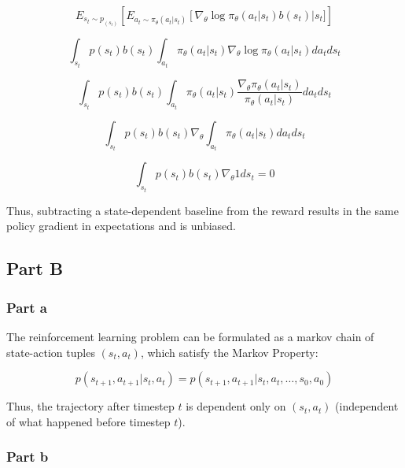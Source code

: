 \documentclass{article}
\begin{document}
    \begin{equation*}
        E_{s_t\sim p_(s_t)} \left[ E_{a_t\sim \pi_\theta(a_t|s_t)}\left[\nabla_\theta \log \pi_\theta(a_t|s_t) b(s_t)\right | s_t]\right]
    \end{equation*}

    \begin{equation*}
        \int_{s_t} p(s_t) b(s_t) \int_{a_t} \pi_\theta (a_t|s_t)\nabla_\theta \log \pi_\theta(a_t|s_t)da_t ds_t
    \end{equation*}

    \begin{equation*}
        \int_{s_t} p(s_t) b(s_t) \int_{a_t} \pi_\theta (a_t|s_t) \frac{\nabla_\theta \pi_\theta(a_t|s_t)}{\pi_\theta(a_t|s_t)} da_t ds_t
    \end{equation*}

    \begin{equation*}
        \int_{s_t} p(s_t) b(s_t) \nabla_\theta \int_{a_t} \pi_\theta (a_t|s_t) da_t ds_t
    \end{equation*}

    \begin{equation*}
        \int_{s_t} p(s_t) b(s_t) \nabla_\theta 1 ds_t = 0
    \end{equation*}

    Thus, subtracting a state-dependent baseline from the reward results in the same policy gradient
    in expectations and is unbiased.

    \subsection{Part B}

    \subsubsection{Part a}
    The reinforcement learning problem can be formulated as a markov chain 
    of state-action tuples $(s_t,a_t)$, which satisfy the Markov Property:

    \begin{equation*}
        p(s_{t+1}, a_{t+1}| s_{t}, a_{t}) = p(s_{t+1}, a_{t+1} | s_{t}, a_{t}, \ldots , s_0, a_0 )
    \end{equation*}

    Thus, the trajectory after timestep $t$ is dependent only on $(s_t, a_t)$
    (independent of what happened before timestep $t$).


    \subsubsection{Part b}
\end{document}
